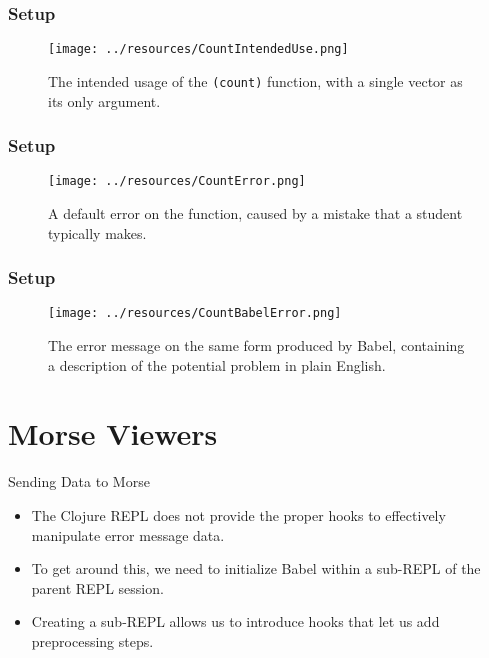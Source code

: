 \documentclass{beamer}
\begin{document}
\begin{frame}
    \frametitle{Setup}
    \begin{figure}
        \centering
        \texttt{[image: ../resources/CountIntendedUse.png]}
        \caption{The intended usage of the \texttt{(count)} function, with a single vector as its only argument.}
        \label{fig:defaultclj}
    \end{figure}
\end{frame}

\begin{frame}
    \frametitle{Setup}
    \begin{figure}
        \centering
        \texttt{[image: ../resources/CountError.png]}
        \caption{A default error on the  function, caused by a mistake that a student typically makes.}
        \label{fig:defaultclj}
    \end{figure}
\end{frame}

\begin{frame}
    \frametitle{Setup}
    \begin{figure}
        \centering
        \texttt{[image: ../resources/CountBabelError.png]}
        \caption{The error message on the same form produced by Babel, containing a description of the potential problem in plain English.}
        \label{fig:defaultclj}
    \end{figure}
\end{frame}

\section{Morse Viewers}

\begin{frame}{Sending Data to Morse}
  \begin{itemize}
    \item<1-> The Clojure REPL does not provide the proper hooks to effectively manipulate error message data.
    \item<2-> To get around this, we need to initialize Babel within a sub-REPL of the parent REPL session.
    \item<3-> Creating a sub-REPL allows us to introduce hooks that let us add preprocessing steps.
  \end{itemize}
\end{frame}
\end{document}
